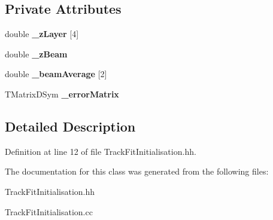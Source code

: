 \subsection*{Private Attributes}
\begin{DoxyCompactItemize}
\item 
double {\bfseries \-\_\-z\-Layer} [4]\label{classTBTrack_1_1TrackFitInitialisation_a6511a2ca609053513dccf4fff7900382}

\item 
double {\bfseries \-\_\-z\-Beam}\label{classTBTrack_1_1TrackFitInitialisation_aa15b79ff7fdac5ab332807bacde256e6}

\item 
double {\bfseries \-\_\-beam\-Average} [2]\label{classTBTrack_1_1TrackFitInitialisation_a1fae67345661eeda08ad32937ae17e67}

\item 
T\-Matrix\-D\-Sym {\bfseries \-\_\-error\-Matrix}\label{classTBTrack_1_1TrackFitInitialisation_aa5d51d04eccb5d362c70d9bd2e51f765}

\end{DoxyCompactItemize}


\subsection{Detailed Description}


Definition at line 12 of file Track\-Fit\-Initialisation.\-hh.



The documentation for this class was generated from the following files\-:\begin{DoxyCompactItemize}
\item 
Track\-Fit\-Initialisation.\-hh\item 
Track\-Fit\-Initialisation.\-cc\end{DoxyCompactItemize}
